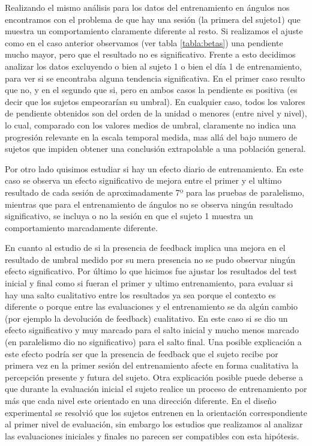 \documentclass{article}
\begin{document}
    Realizando el mismo análisis para los datos del entrenamiento en ángulos nos encontramos con el problema de que hay una sesión (la primera del sujeto1) que muestra un comportamiento claramente diferente al resto. Si realizamos el ajuste como en el caso anterior observamos (ver tabla \ref{tabla:betas}) una pendiente mucho mayor, pero que el resultado no es significativo. Frente a esto decidimos analizar los datos excluyendo o bien al sujeto 1 o bien el día 1 de entrenamiento, para ver si se encontraba alguna tendencia significativa. En el primer caso resulto que no, y en el segundo que si, pero en ambos casos la pendiente es positiva (es decir que los sujetos empeorarían su umbral). En cualquier caso, todos los valores de pendiente obtenidos son del orden de la unidad o menores (entre nivel y nivel), lo cual, comparado con los valores medios de umbral, claramente no indica una progresión relevante en la escala temporal medida, mas allá del bajo numero de sujetos que impiden obtener una conclusión extrapolable a una población general.  
    
    Por otro lado quisimos estudiar si hay un efecto diario de entrenamiento. En este caso se observa un efecto significativo de mejora entre el primer y el ultimo resultado de cada sesión de aproximadamente 7º para las pruebas de paralelismo, mientras que para el entrenamiento de ángulos no se observa ningún resultado significativo, se incluya o no la sesión en que el sujeto 1 muestra un comportamiento marcadamente diferente.
    
    En cuanto al estudio de si la presencia de feedback implica una mejora en el resultado de umbral medido por su mera presencia no se pudo observar ningún efecto significativo. Por último lo que hicimos fue ajustar los resultados del test inicial y final como si fueran el primer y ultimo entrenamiento, para evaluar si hay una salto cualitativo entre los resultados ya sea porque el contexto es diferente o porque entre las evaluaciones y el entrenamiento se da algún cambio (por ejemplo la devolución de feedback) cualitativo. En este caso si se dio un efecto significativo y muy marcado para el salto inicial y mucho menos marcado (en paralelismo dio no significativo) para el salto final. Una posible explicación a este efecto podría ser que la presencia de feedback que el sujeto recibe por primera vez en la primer sesión del entrenamiento afecte en forma cualitativa la percepción presente y futura del sujeto. Otra explicación posible puede deberse a que durante la evaluación inicial el sujeto realice un proceso de entrenamiento por más que cada nivel este orientado en una dirección diferente. En el diseño experimental se resolvió que los sujetos entrenen en la orientación correspondiente al primer nivel de evaluación, sin embargo los estudios que realizamos al analizar las evaluaciones iniciales y finales no parecen ser compatibles con esta hipótesis. 
\end{document}
